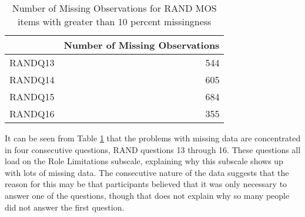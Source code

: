 \documentclass{article}
\begin{document}


















\begin{table}[ht]
\centering
\begin{tabular}{rr}
  \hline
 & Number of Missing Observations \\ 
  \hline
RANDQ13 & 544 \\ 
  RANDQ14 & 605 \\ 
  RANDQ15 & 684 \\ 
  RANDQ16 & 355 \\ 
   \hline
\end{tabular}
\caption{Number of Missing Observations for RAND MOS items with greater than 10 percent missingness} 
\label{tab:missingmanytable}
\end{table}
It can be seen from Table \ref{tab:missingmanytable} that the problems with missing data are concentrated in four consecutive questions, RAND questions 13 through 16. These questions all load on the Role Limitations subscale, explaining why this subscale shows up with lots of missing data.  The consecutive nature of the data suggests that the reason for this may be that participants believed that it was only necessary to answer one of the questions, though that does not explain why so many people did not answer the first question.
\end{document}
